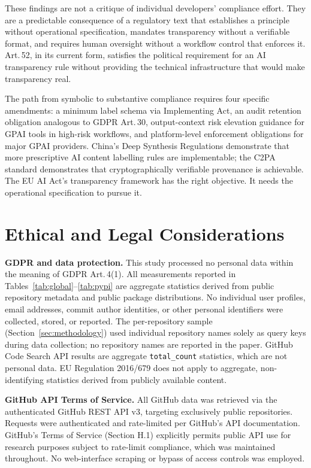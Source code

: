\documentclass[conference]{IEEEtran}
\begin{document}
These findings are not a critique of individual developers' compliance
effort.  They are a predictable consequence of a regulatory text that
establishes a principle without operational specification, mandates
transparency without a verifiable format, and requires human oversight
without a workflow control that enforces it.  Art.\,52, in its current
form, satisfies the political requirement for an AI transparency rule
without providing the technical infrastructure that would make
transparency real.

The path from symbolic to substantive compliance requires four specific
amendments: a minimum label schema via Implementing Act, an audit
retention obligation analogous to GDPR Art.\,30, output-context risk
elevation guidance for GPAI tools in high-risk workflows, and
platform-level enforcement obligations for major GPAI providers.
China's Deep Synthesis Regulations demonstrate that more prescriptive
AI content labelling rules are implementable; the C2PA standard
demonstrates that cryptographically verifiable provenance is achievable.
The EU AI Act's transparency framework has the right objective.  It
needs the operational specification to pursue it.

\section{Ethical and Legal Considerations}
\label{sec:ethics}

\textbf{GDPR and data protection.}  This study processed no personal
data within the meaning of GDPR Art.\,4(1).  All measurements reported
in Tables~\ref{tab:global}--\ref{tab:pypi} are aggregate statistics
derived from public repository metadata and public package distributions.
No individual user profiles, email addresses, commit author identities,
or other personal identifiers were collected, stored, or reported.  The
per-repository sample (Section~\ref{sec:methodology}) used individual
repository names solely as query keys during data collection; no
repository names are reported in the paper.  GitHub Code Search API
results are aggregate \texttt{total\_count} statistics, which are not
personal data.  EU Regulation 2016/679 does not apply to aggregate,
non-identifying statistics derived from publicly available content.

\textbf{GitHub API Terms of Service.}  All GitHub data was retrieved via
the authenticated GitHub REST API v3, targeting exclusively public
repositories.  Requests were authenticated and rate-limited per GitHub's
API documentation.  GitHub's Terms of Service (Section H.1) explicitly
permits public API use for research purposes subject to rate-limit
compliance, which was maintained throughout.  No web-interface scraping
or bypass of access controls was employed.
\end{document}
